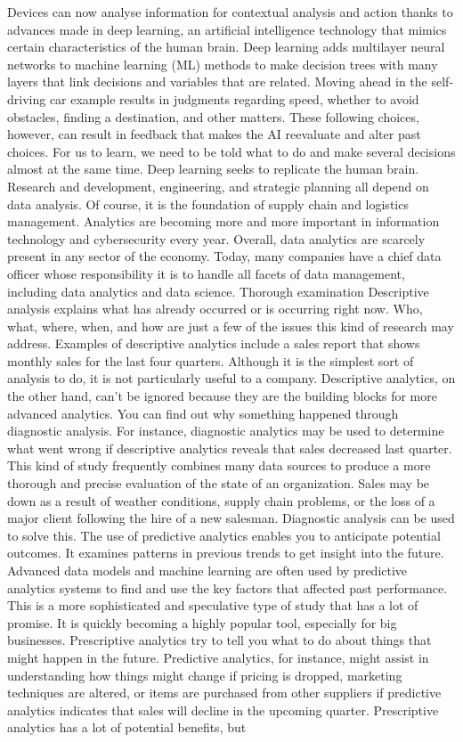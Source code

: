 \documentclass[journal]{IEEEtran}
\begin{document}
\par Devices can now analyse information for contextual analysis and action thanks to advances made in deep learning, an artificial intelligence technology that mimics certain characteristics of the human brain. Deep learning adds multilayer neural networks to machine learning (ML) methods to make decision trees with many layers that link decisions and variables that are related. Moving ahead in the self-driving car example results in judgments regarding speed, whether to avoid obstacles, finding a destination, and other matters. These following choices, however, can result in feedback that makes the AI reevaluate and alter past choices. For us to learn, we need to be told what to do and make several decisions almost at the same time. Deep learning seeks to replicate the human brain. Research and development, engineering, and strategic planning all depend on data analysis. Of course, it is the foundation of supply chain and logistics management. Analytics are becoming more and more important in information technology and cybersecurity every year. Overall, data analytics are scarcely present in any sector of the economy. Today, many companies have a chief data officer whose responsibility it is to handle all facets of data management, including data analytics and data science. Thorough examination Descriptive analysis explains what has already occurred or is occurring right now. Who, what, where, when, and how are just a few of the issues this kind of research may address. Examples of descriptive analytics include a sales report that shows monthly sales for the last four quarters. Although it is the simplest sort of analysis to do, it is not particularly useful to a company. Descriptive analytics, on the other hand, can't be ignored because they are the building blocks for more advanced analytics. You can find out why something happened through diagnostic analysis. For instance, diagnostic analytics may be used to determine what went wrong if descriptive analytics reveals that sales decreased last quarter. This kind of study frequently combines many data sources to produce a more thorough and precise evaluation of the state of an organization. Sales may be down as a result of weather conditions, supply chain problems, or the loss of a major client following the hire of a new salesman. Diagnostic analysis can be used to solve this. The use of predictive analytics enables you to anticipate potential outcomes. It examines patterns in previous trends to get insight into the future. Advanced data models and machine learning are often used by predictive analytics systems to find and use the key factors that affected past performance. This is a more sophisticated and speculative type of study that has a lot of promise. It is quickly becoming a highly popular tool, especially for big businesses. Prescriptive analytics try to tell you what to do about things that might happen in the future. Predictive analytics, for instance, might assist in understanding how things might change if pricing is dropped, marketing techniques are altered, or items are purchased from other suppliers if predictive analytics indicates that sales will decline in the upcoming quarter. Prescriptive analytics has a lot of potential benefits, but 
\end{document}
